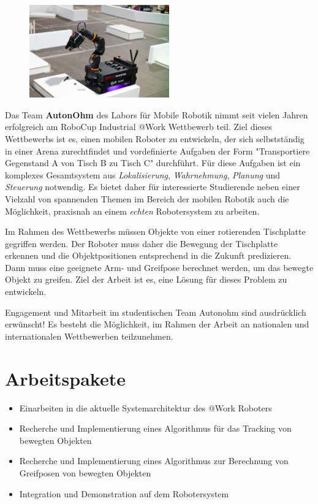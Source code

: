 \documentclass{ohm_project_description}
\begin{document}
\maketitle
\thispagestyle{fancy}

\vspace*{-2.5cm}
\begin{figure}[h!]
    \centering
    \includegraphics[height=4cm]{img/atwork.jpg}
\end{figure} 


Das Team \textbf{AutonOhm} des Labors für Mobile Robotik nimmt seit vielen Jahren erfolgreich am RoboCup Industrial @Work Wettbewerb teil. Ziel dieses Wettbewerbs ist es, einen mobilen Roboter zu entwickeln, der sich selbstständig in einer Arena zurechtfindet und vordefinierte Aufgaben der Form "Transportiere Gegenstand A von Tisch B zu Tisch C" durchführt. Für diese Aufgaben ist ein komplexes Gesamtsystem aus \emph{Lokalisierung}, \emph{Wahrnehmung}, \emph{Planung} und \emph{Steuerung} notwendig. Es bietet daher für interessierte Studierende neben einer Vielzahl von spannenden Themen im Bereich der mobilen Robotik auch die Möglichkeit, praxisnah an einem \emph{echten} Robotersystem zu arbeiten.

Im Rahmen des Wettbewerbs müssen Objekte von einer rotierenden Tischplatte gegriffen werden. Der Roboter muss daher die Bewegung der Tischplatte erkennen und die Objektpositionen entsprechend in die Zukunft predizieren. Dann muss eine geeignete Arm- und Greifpose berechnet werden, um das bewegte Objekt zu greifen. Ziel der Arbeit ist es, eine Lösung für dieses Problem zu entwickeln.  

Engagement und Mitarbeit im studentischen Team Autonohm sind ausdrücklich erwünscht! Es besteht die Möglichkeit, im Rahmen der Arbeit an nationalen und internationalen Wettbewerben teilzunehmen.

\section*{Arbeitspakete}
\begin{itemize}[leftmargin=0.5cm]
    \setlength\itemsep{.1em}
    \item Einarbeiten in die aktuelle Systemarchitektur des @Work Roboters
    \item Recherche und Implementierung eines Algorithmus für das Tracking von bewegten Objekten
    \item Recherche und Implementierung eines Algorithmus zur Berechnung von Greifposen von bewegten Objekten
    \item Integration und Demonstration auf dem Robotersystem 
\end{itemize}
\end{document}
